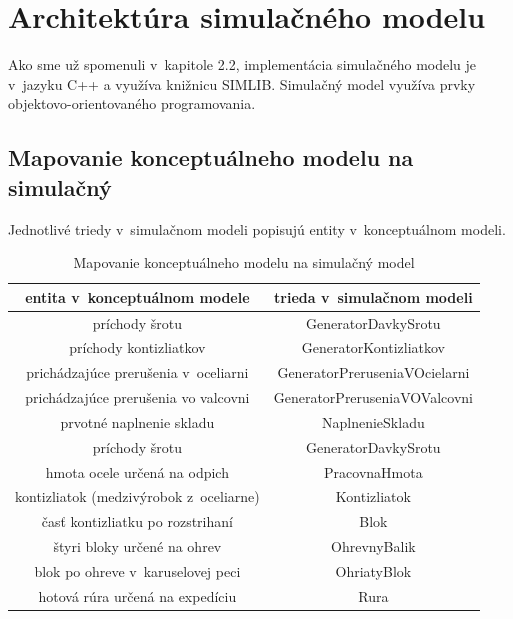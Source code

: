 \documentclass[]{article}
\begin{document}
\section{Architektúra simulačného modelu}
Ako sme už spomenuli v~kapitole 2.2, implementácia simulačného modelu je v~jazyku C++ a využíva knižnicu SIMLIB. Simulačný model využíva prvky objektovo-orientovaného programovania.

\subsection{Mapovanie konceptuálneho modelu na simulačný}
Jednotlivé triedy v~simulačnom modeli popisujú entity v~konceptuálnom modeli.

\begin{center}
	\begin{table}[!h]
		\centering
		\begin{tabular}{|c|c|} 
			\hline
			entita v~konceptuálnom modele & trieda v~simulačnom modeli \\
			\hline
			\hline
			príchody šrotu & GeneratorDavkySrotu \\
			\hline
			príchody kontizliatkov & GeneratorKontizliatkov \\
			\hline
			prichádzajúce prerušenia v~oceliarni & GeneratorPreruseniaVOcielarni \\
			\hline
			prichádzajúce prerušenia vo valcovni & GeneratorPreruseniaVOValcovni \\
			\hline
			prvotné naplnenie skladu & NaplnenieSkladu\\
			\hline
			príchody šrotu & GeneratorDavkySrotu \\
			\hline
			hmota ocele určená na odpich & PracovnaHmota \\
			\hline
			kontizliatok (medzivýrobok z~oceliarne) & Kontizliatok \\
			\hline
			časť kontizliatku po rozstrihaní & Blok \\
			\hline
			štyri bloky určené na ohrev & OhrevnyBalik \\
			\hline
			blok po ohreve v~karuselovej peci & OhriatyBlok \\
			\hline
			hotová rúra určená na expedíciu & Rura \\
			\hline
		\end{tabular}
		\caption{Mapovanie konceptuálneho modelu na simulačný model}
	\end{table}
\end{center}
\end{document}
